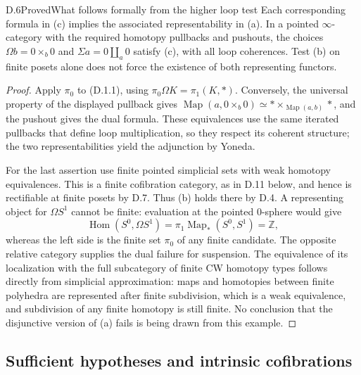\begin{result}{D.6}{Proved}{What follows formally from the higher loop test}
Each corresponding formula in (c) implies the associated
representability in (a). In a pointed $\infty$-category with the
required homotopy pullbacks and pushouts, the choices
$\Omega b=0\times_b0$ and $\Sigma a=0\amalg_a0$ satisfy (c), with
all loop coherences. Test (b) on finite posets alone does not force
the existence of both representing functors.
\end{result}
\begin{proof}
Apply $\pi_0$ to (D.1.1), using
$\pi_0\Omega K=\pi_1(K,*)$. Conversely, the universal property of
the displayed pullback gives
$\operatorname{Map}(a,0\times_b0)\simeq
 *\times_{\operatorname{Map}(a,b)}*$, and the pushout gives the
dual formula. These equivalences use the same iterated pullbacks
that define loop multiplication, so they respect its coherent
structure; the two representabilities yield the adjunction by Yoneda.

For the last assertion use finite pointed simplicial sets with weak
homotopy equivalences. This is a finite cofibration category, as in
D.11 below, and hence is rectifiable at finite posets by D.7. Thus
(b) holds there by D.4. A representing object for $\Omega S^1$
cannot be finite: evaluation at the pointed $0$-sphere would give
\[
 \operatorname{Hom}(S^0,\Omega S^1)=
 \pi_1\operatorname{Map}_*(S^0,S^1)=\mathbb Z,
\]
whereas the left side is the finite set $\pi_0$ of any finite
candidate. The opposite relative category supplies the dual
failure for suspension. The equivalence of its localization with
the full subcategory of finite CW homotopy types follows directly
from simplicial approximation: maps and homotopies between finite
polyhedra are represented after finite subdivision, which is a weak
equivalence, and subdivision of any finite homotopy is still finite.
No conclusion that the disjunctive version of (a) fails is being
drawn from this example.
\end{proof}

\subsection{Sufficient hypotheses and intrinsic cofibrations}

